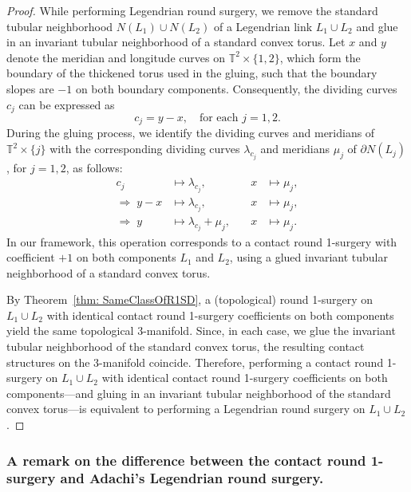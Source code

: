 \documentclass{amsart}
\theoremstyle{plain}
\theoremstyle{remark}
\theoremstyle{definition}
\begin{document}
\begin{proof} 
While performing Legendrian round surgery, we remove the standard tubular neighborhood 
$N(L_1) \cup N(L_2)$ of a Legendrian link $L_1 \cup L_2$ and glue in an invariant 
tubular neighborhood of a standard convex torus. 
Let $x$ and $y$ denote the meridian and longitude curves on 
$\mathbb{T}^2 \times \{1,2\}$, which form the boundary of the thickened torus used in the gluing, such that the boundary slopes are $-1$ on both boundary components. Consequently, the dividing curves 
$c_j$ can be expressed as 
\[
    c_j = y-x, \quad \text{for each } j = 1, 2.
\]
During the gluing process, we identify the dividing curves and meridians of $\mathbb{T}^2 \times \{j\}$ with the corresponding dividing curves 
$\lambda_{c_j}$ and meridians $\mu_j$ of $\partial N(L_j)$, for $j = 1, 2$, as follows:
\[
\begin{aligned}
c_j &\mapsto \lambda_{c_j}, & \quad x &\mapsto \mu_j,\\
\Rightarrow\; y - x &\mapsto \lambda_{c_j}, & \quad x &\mapsto \mu_j,\\
\Rightarrow\; y &\mapsto \lambda_{c_j} + \mu_j, & \quad x &\mapsto \mu_j.
\end{aligned}
\]
In our framework, this operation corresponds to a contact round 1-surgery 
with coefficient $+1$ on both components $L_1$ and $L_2$, using a glued invariant 
tubular neighborhood of a standard convex torus.

By Theorem~\ref{thm: SameClassOfR1SD}, a (topological) round 1-surgery on 
$L_1 \cup L_2$ with identical contact round 1-surgery coefficients on both 
components yield the same topological 3-manifold. 
Since, in each case, we glue the invariant tubular neighborhood of the standard 
convex torus, the resulting contact structures on the 3-manifold coincide.
Therefore, performing a {contact round 1-surgery} on $L_1 \cup L_2$ with 
identical contact round 1-surgery coefficients on both components—and gluing in 
an invariant tubular neighborhood of the standard convex torus—is equivalent to 
performing a {Legendrian round surgery} on $L_1 \cup L_2$.
\end{proof}

\subsubsection{A remark on the difference between the contact round 1-surgery and Adachi's Legendrian round surgery.}
\end{document}
